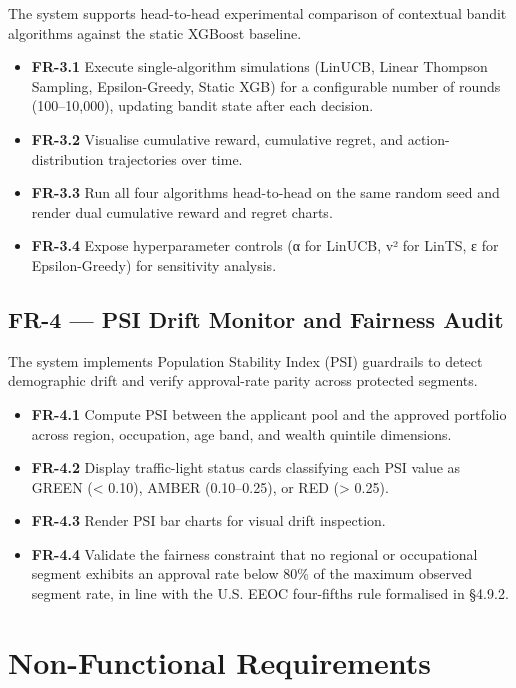 The system supports head-to-head experimental comparison of contextual bandit algorithms against the static XGBoost baseline.

\begin{itemize}
\tightlist
\item
  \textbf{FR-3.1} Execute single-algorithm simulations (LinUCB, Linear Thompson Sampling, Epsilon-Greedy, Static XGB) for a configurable number of rounds (100--10,000), updating bandit state after each decision.
\item
  \textbf{FR-3.2} Visualise cumulative reward, cumulative regret, and action-distribution trajectories over time.
\item
  \textbf{FR-3.3} Run all four algorithms head-to-head on the same random seed and render dual cumulative reward and regret charts.
\item
  \textbf{FR-3.4} Expose hyperparameter controls (α for LinUCB, v² for LinTS, ε for Epsilon-Greedy) for sensitivity analysis.
\end{itemize}

\subsection{FR-4 --- PSI Drift Monitor and Fairness Audit}\label{fr-4-psi-drift-monitor-and-fairness-audit}

The system implements Population Stability Index (PSI) guardrails to detect demographic drift and verify approval-rate parity across protected segments.

\begin{itemize}
\tightlist
\item
  \textbf{FR-4.1} Compute PSI between the applicant pool and the approved portfolio across region, occupation, age band, and wealth quintile dimensions.
\item
  \textbf{FR-4.2} Display traffic-light status cards classifying each PSI value as GREEN (\textless{} 0.10), AMBER (0.10--0.25), or RED (\textgreater{} 0.25).
\item
  \textbf{FR-4.3} Render PSI bar charts for visual drift inspection.
\item
  \textbf{FR-4.4} Validate the fairness constraint that no regional or occupational segment exhibits an approval rate below 80\% of the maximum observed segment rate, in line with the U.S. EEOC four-fifths rule formalised in §4.9.2.
\end{itemize}

\section{Non-Functional Requirements}\label{non-functional-requirements}

